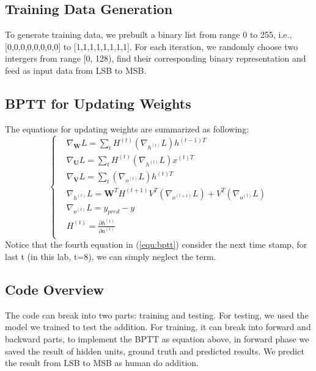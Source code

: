 \documentclass[12pt,a4paper]{article}
\begin{document}
\subsection{Training Data Generation}
To generate training data, we prebuilt a binary list from range 0 to 255, i.e., [0,0,0,0,0,0,0,0] to [1,1,1,1,1,1,1,1]. For each iteration, we randomly choose two intergers from range [0, 128), find their corresponding binary representation and feed as input data from LSB to MSB.

\subsection{BPTT for Updating Weights}
The equations for updating weights are summarized as following:
\begin{equation}
\begin{cases}
& \nabla_{\textbf{W}}L = \sum_{t}{H^{(t)}(\nabla_{h^{(t)}} L)h^{(t-1)T}}\\
& \nabla_{\textbf{U}}L = \sum_{t}{H^{(t)}(\nabla_{h^{(t)}} L)x^{(t)T}}\\ 
& \nabla_{\textbf{V}}L = \sum_{t}(\nabla_{o^{(t)}}L) h^{(t)T} \\
& \nabla_{{h^{(t)}}}L = \textbf{W}^T H^{(t+1)} V^T (\nabla_{o^{(t+1)}}L)+ V^T (\nabla_{o^{(t)}}L)\\
& \nabla_{o^{(t)}}L = y_{pred} - y \\
& H^{(t)} = \frac{\partial{h^{(t)}}}{\partial{a^{(t)}}} \\
\end{cases}
\label{equ:bptt}
\end{equation}
Notice that the fourth equation in (\ref{equ:bptt}) consider the next time stamp, for last t (in this lab, t=8), we can simply neglect the term.
\subsection{Code Overview}
The code can break into two parts: training and testing. For testing, we used the model we trained to test the addition. For training, it can break into forward and backward parts, to implement the BPTT as equation above, in forward phase we saved the result of hidden units, ground truth and predicted results. We predict the result from LSB to MSB as human do addition.
\end{document}
